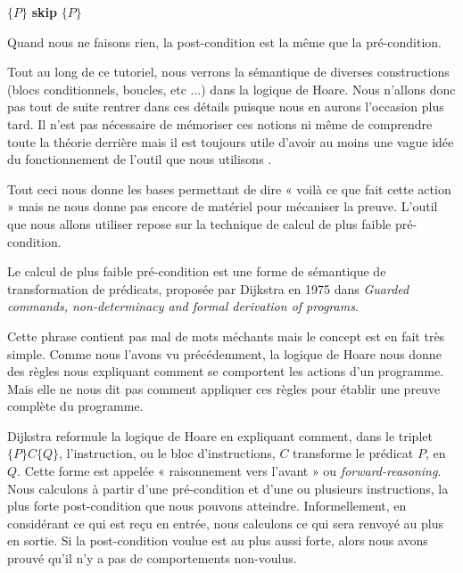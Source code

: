 \begin{center}
$\{P\}$ \textbf{skip} $\{P\}$


\end{center}


Quand nous ne faisons rien, la post-condition est la même que la pré-condition.



Tout au long de ce tutoriel, nous verrons la sémantique de diverses 
constructions (blocs conditionnels, boucles, etc ...) dans la logique de Hoare.
Nous n'allons donc pas tout de suite rentrer dans ces détails puisque nous en
aurons l'occasion plus tard. Il n'est pas nécessaire de mémoriser ces notions
ni même de comprendre toute la théorie derrière mais il est toujours utile
d'avoir au moins une vague idée du fonctionnement de l'outil que nous
utilisons  .



Tout ceci nous donne les bases permettant de dire « voilà ce que fait cette 
action » mais ne nous donne pas encore de matériel pour mécaniser la preuve. 
L'outil que nous allons utiliser repose sur la technique de calcul de plus 
faible pré-condition.





Le calcul de plus faible pré-condition est une forme de sémantique de 
transformation de prédicats, proposée par Dijkstra en 1975 dans \textit{Guarded 
commands, non-determinacy and formal derivation of programs}.



Cette phrase contient pas mal de mots méchants mais le concept est en fait très
simple. Comme nous l'avons vu précédemment, la logique de Hoare nous donne des
règles nous expliquant comment se comportent les actions d'un programme. Mais 
elle ne nous dit pas comment appliquer ces règles pour établir une preuve 
complète du programme.



Dijkstra reformule la logique de Hoare en expliquant comment, dans le triplet 
$\{P\}C\{Q\}$, l'instruction, ou le bloc d'instructions, $C$ transforme le 
prédicat $P$, en $Q$. Cette forme est appelée « raisonnement vers l'avant » ou 
\textit{forward-reasoning}. Nous calculons à partir d'une pré-condition et d'une ou 
plusieurs instructions, la plus forte post-condition que nous pouvons
atteindre. Informellement, en considérant ce qui est reçu en entrée, nous 
calculons ce qui sera renvoyé au plus en sortie. Si la post-condition voulue
est au plus aussi forte, alors nous avons prouvé qu'il n'y a pas de 
comportements non-voulus.



